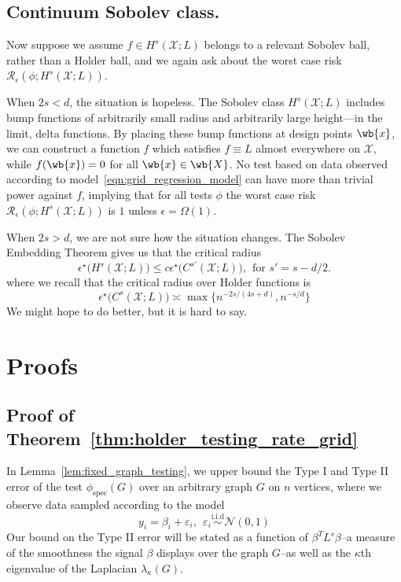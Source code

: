 \documentclass{article}
\newcommand{\1}{\mathbf{1}}
\newcommand{\Xset}{\mathcal{X}}
\newcommand{\spec}{\mathrm{spec}}
\theoremstyle{alden}
\theoremstyle{aldenthm}
\theoremstyle{definition}
\theoremstyle{remark}
\begin{document}
\subsection{Continuum Sobolev class.}

Now suppose we assume $f \in H^s(\Xset;L)$ belongs to a relevant Sobolev ball, rather than a Holder ball, and we again ask about the worst case risk $\mathcal{R}_{\epsilon}(\phi;H^s(\Xset;L))$.

When $2s < d$, the situation is hopeless. The Sobolev class $H^s(\Xset;L)$ includes bump functions of arbitrarily small radius and arbitrarily large height---in the limit, delta functions. By placing these bump functions at design points $\wb{x}$, we can construct a function $f$ which satisfies $f \equiv L$ almost everywhere on $\Xset$, while $f(\wb{x}) = 0$ for all $\wb{x} \in \wb{X}$. No test based on data observed according to model~\eqref{eqn:grid_regression_model} can have more than trivial power against $f$, implying that for all tests $\phi$ the worst case risk $\mathcal{R}_{\epsilon}(\phi;H^s(\Xset;L))$ is $1$ unless $\epsilon = \Omega(1)$.

When $2s > d$, we are not sure how the situation changes. The Sobolev Embedding Theorem gives us that the critical radius 
\begin{equation*}
\epsilon^{\star}\bigl(H^s(\Xset;L)\bigr) \leq c \epsilon^{\star}\bigl(C^{s'}(\Xset;L)\bigr),~~\textrm{for $s' = s - d/2$.}
\end{equation*}
where we recall that the critical radius over Holder functions is
\begin{equation*}
\epsilon^{\star}\bigl(C^{s}(\Xset;L)\bigr) \asymp \max\bigl\{n^{-2s/(4s + d)}, n^{-s/d}\bigr\}
\end{equation*}
We might hope to do better, but it is hard to say.

\section{Proofs}

\subsection{Proof of Theorem~\ref{thm:holder_testing_rate_grid}}

In Lemma~\ref{lem:fixed_graph_testing}, we upper bound the Type I and Type II error of the test $\phi_{\spec}(G)$ over an arbitrary graph $G$ on $n$ vertices, where we observe data sampled according to the model
\begin{equation}
\label{eqn:regression_model_fixed_graph}
y_i = \beta_i + \varepsilon_i,~~\varepsilon_i \overset{\textrm{i.i.d}}{\sim} \mathcal{N}(0,1)
\end{equation}
Our bound on the Type II error will be stated as a function of $\beta^T L^s \beta$--a measure of the smoothness the signal $\beta$ displays over the graph $G$--as well as the $\kappa$th eigenvalue of the Laplacian $\lambda_{\kappa}(G)$.
\end{document}
